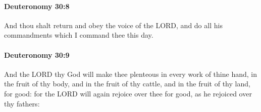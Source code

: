 		\paragraph{Deuteronomy 30:8} %
			\label{DEUTERONOMY-30-8}

			And thou shalt return and obey the voice of the LORD, and do all his commandments which I command thee this day.


		\paragraph{Deuteronomy 30:9} %
			\label{DEUTERONOMY-30-9}

			And the LORD thy God will make thee plenteous in every work of thine hand, in the fruit of thy body, and in the fruit of thy cattle, and in the fruit of thy land, for good: for the LORD will again rejoice over thee for good, as he rejoiced over thy fathers:

